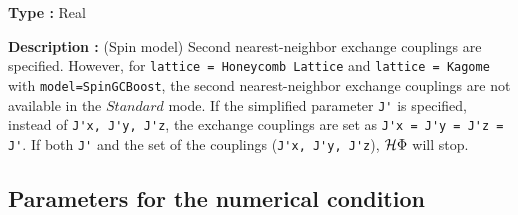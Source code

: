 \begin{itemize}
{\bf Type :} Real

{\bf Description :} (Spin model)
Second nearest-neighbor exchange couplings are specified.
However, for \verb|lattice = Honeycomb Lattice| and  \verb|lattice = Kagome|
with \verb|model=SpinGCBoost|,
the second nearest-neighbor exchange couplings are not available in the $Standard$ mode.
If the simplified parameter \verb|J'| is specified, instead of
\verb|J'x, J'y, J'z|,
the exchange couplings are set as
\verb|J'x = J'y = J'z = J'|.
If both \verb|J'| and the set of the couplings (\verb|J'x, J'y, J'z|),
$\mathcal{H} \Phi$ will stop.
\end{itemize}

\subsection{Parameters for the numerical condition}
